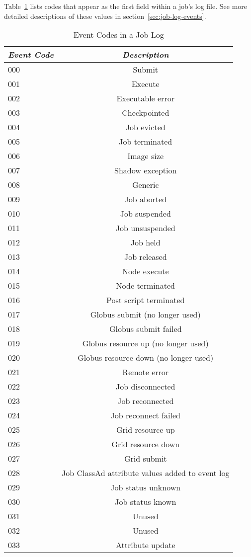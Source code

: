 Table~\ref{table:user-log-event-codes} lists codes that appear as 
the first field within a job's log file.
See more detailed descriptions of these values in
section~\ref{sec:job-log-events}.
\begin{center}
\begin{table}[H]
\caption{\label{table:user-log-event-codes}Event Codes in a Job Log}
\begin{tabular}{|l|c|} \hline
\emph{Event Code} & \emph{Description}   \\ \hline \hline
000   &   Submit  \\ \hline
001   &   Execute  \\ \hline
002   &   Executable error  \\ \hline
003   &   Checkpointed  \\ \hline
004   &   Job evicted  \\ \hline
005   &   Job terminated  \\ \hline
006   &   Image size  \\ \hline
007   &   Shadow exception  \\ \hline
008   &   Generic  \\ \hline
009   &   Job aborted  \\ \hline
010  &   Job suspended  \\ \hline
011  &   Job unsuspended  \\ \hline
012  &   Job held  \\ \hline
013  &   Job released  \\ \hline
014  &   Node execute  \\ \hline
015  &   Node terminated  \\ \hline
016  &   Post script terminated  \\ \hline
017  &   Globus submit (no longer used)  \\ \hline
018  &   Globus submit failed  \\ \hline
019  &   Globus resource up (no longer used)  \\ \hline
020  &   Globus resource down (no longer used)  \\ \hline
021  &   Remote error  \\ \hline
022  &   Job disconnected  \\ \hline
023  &   Job reconnected  \\ \hline
024  &   Job reconnect failed  \\ \hline
025  &   Grid resource up \\ \hline
026  &   Grid resource down \\ \hline
027  &   Grid submit \\ \hline
028  &   Job ClassAd attribute values added to event log  \\ \hline
029  &   Job status unknown \\ \hline
030  &   Job status known \\ \hline
031  &   Unused \\ \hline
032  &   Unused \\ \hline
033  &   Attribute update \\ \hline
\end{tabular}
\end{table}
\end{center}


